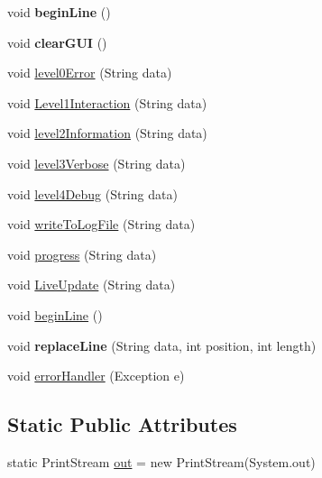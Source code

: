 \begin{DoxyCompactItemize}
\item 
\hypertarget{classCASUAL_1_1Log_a1d6df28a1115d39b98d7d4f205d3e071}{void {\bfseries begin\-Line} ()}\label{classCASUAL_1_1Log_a1d6df28a1115d39b98d7d4f205d3e071}

\item 
\hypertarget{classCASUAL_1_1Log_ab95e98c154362d8c538a9d056004581c}{void {\bfseries clear\-G\-U\-I} ()}\label{classCASUAL_1_1Log_ab95e98c154362d8c538a9d056004581c}

\item 
void \hyperlink{classCASUAL_1_1Log_afc35f2858108aa81be706cd2d6677ed2}{level0\-Error} (String data)
\item 
void \hyperlink{classCASUAL_1_1Log_a06abaf9f5e1511bdd79a2b9cebd9b4a0}{Level1\-Interaction} (String data)
\item 
void \hyperlink{classCASUAL_1_1Log_aa414ecc1573182ea68c55c9be1f4870a}{level2\-Information} (String data)
\item 
void \hyperlink{classCASUAL_1_1Log_a2ddc8d9b645b62e1ceb3037e24670190}{level3\-Verbose} (String data)
\item 
void \hyperlink{classCASUAL_1_1Log_ab674594609b46c9e6657818be10d1789}{level4\-Debug} (String data)
\item 
void \hyperlink{classCASUAL_1_1Log_acd0cd0a6ea0d89511fd97317715daa72}{write\-To\-Log\-File} (String data)
\item 
void \hyperlink{classCASUAL_1_1Log_ac7992ba5f3159c62058e5477c2ad4f5c}{progress} (String data)
\item 
void \hyperlink{classCASUAL_1_1Log_a5d1038ccb55197df55664c7b62adc810}{Live\-Update} (String data)
\item 
void \hyperlink{classCASUAL_1_1Log_a1d6df28a1115d39b98d7d4f205d3e071}{begin\-Line} ()
\item 
\hypertarget{classCASUAL_1_1Log_a46852a574166ce1c0f1d20b5f4122363}{void {\bfseries replace\-Line} (String data, int position, int length)}\label{classCASUAL_1_1Log_a46852a574166ce1c0f1d20b5f4122363}

\item 
void \hyperlink{classCASUAL_1_1Log_a90ec16385f2b20b9f06e367c22f34af2}{error\-Handler} (Exception e)
\end{DoxyCompactItemize}
\subsection*{Static Public Attributes}
\begin{DoxyCompactItemize}
\item 
static Print\-Stream \hyperlink{classCASUAL_1_1Log_a004327eeb7230d6af9f995b257a656ff}{out} = new Print\-Stream(System.\-out)
\end{DoxyCompactItemize}


